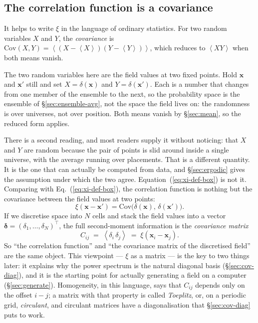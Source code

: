 \documentclass[12pt]{article}
\newcommand{\bx}{\mathbf{x}}
\newcommand{\avg}[1]{\left\langle #1 \right\rangle}
\begin{document}
\subsection{The correlation function is a covariance}
\label{sec:xi-covariance}

It helps to write $\xi$ in the language of ordinary statistics.  For two
random variables $X$ and $Y$, the \emph{covariance} is
$\mathrm{Cov}(X, Y) = \avg{(X - \avg{X})(Y - \avg{Y})}$, which reduces to
$\avg{XY}$ when both means vanish.

The two random variables here are the field values at two fixed points.
Hold $\bx$ and $\bx'$ still and set $X = \delta(\bx)$ and
$Y = \delta(\bx')$.  Each is a number that changes from one member of the
ensemble to the next, so the probability space is the ensemble of
\S\ref{sec:ensemble-avg}, not the space the field lives on: the
randomness is over universes, not over position.  Both means vanish by
\S\ref{sec:mean}, so the reduced form applies.

There is a second reading, and most readers supply it without noticing:
that $X$ and $Y$ are random because the pair of points is slid around
inside a single universe, with the average running over placements.  That
is a different quantity.  It is the one that can actually be computed from
data, and \S\ref{sec:ergodic} gives the assumption under which the two
agree.  Equation~(\ref{eq:xi-def-box}) is not it.  Comparing with
Eq.~(\ref{eq:xi-def-box}), the correlation function is nothing but the
covariance between the field values at two points:
\begin{equation}
  \xi(\bx - \bx') = \mathrm{Cov}\bigl(\delta(\bx),\,\delta(\bx')\bigr).
\end{equation}
If we discretise space into $N$ cells and stack the field values into a
vector $\boldsymbol\delta = (\delta_1, \dots, \delta_N)^\top$, the full
second-moment information is the \emph{covariance matrix}
\begin{equation}
  C_{ij} \;=\; \avg{\delta_i\,\delta_j} \;=\; \xi(\bx_i - \bx_j).
  \label{eq:covmatrix}
\end{equation}
So ``the correlation function'' and ``the covariance matrix of the
discretised field'' are the same object.  This viewpoint --- $\xi$ as a
matrix --- is the key to two things later: it explains why the power
spectrum is the natural diagonal basis (\S\ref{sec:cov-diag}), and it is
the starting point for actually generating a field on a computer
(\S\ref{sec:generate}).  Homogeneity, in this language, says that $C_{ij}$
depends only on the offset $i - j$; a matrix with that property is called
\emph{Toeplitz}, or, on a periodic grid, \emph{circulant}, and circulant
matrices have a diagonalisation that \S\ref{sec:cov-diag} puts to work.
\end{document}
